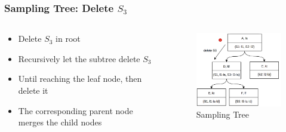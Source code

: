 \documentclass[notheorems, aspectratio=54]{beamer}
\begin{document}
\begin{frame}
    \frametitle{Sampling Tree: Delete $S_3$}
    \begin{columns}
        \begin{column}{0.48\textwidth}
            \begin{itemize}
                \item Delete $S_3$ in root
                \item Recursively let the subtree delete $S_3$
                \item Until reaching the leaf node, then delete it
                \item The corresponding parent node merges the child nodes
            \end{itemize}
        \end{column}
        \begin{column}{0.48\textwidth}
            \begin{figure}
                \centering
                \includegraphics[width=6cm]{global_img_dir/delete1.png}
                \caption{Sampling Tree}
            \end{figure}
        \end{column}
    \end{columns}
\end{frame}
\end{document}
